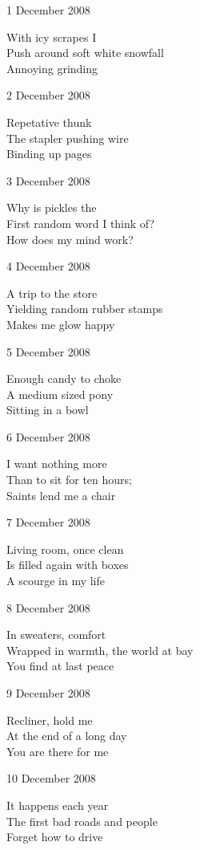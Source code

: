 \documentclass[12pt]{article}
\begin{document}
1 December 2008

With icy scrapes I \\
Push around soft white snowfall \\
Annoying grinding

2 December 2008

Repetative thunk \\
The stapler pushing wire \\
Binding up pages

3 December 2008

Why is pickles the \\
First random word I think of? \\
How does my mind work?

\newpage

4 December 2008

A trip to the store \\
Yielding random rubber stamps \\
Makes me glow happy

5 December 2008

Enough candy to choke \\
A medium sized pony \\
Sitting in a bowl

6 December 2008

I want nothing more \\
Than to sit for ten hours; \\
Saints lend me a chair

7 December 2008

Living room, once clean \\
Is filled again with boxes \\
A scourge in my life

8 December 2008

In sweaters, comfort \\
Wrapped in warmth, the world at bay \\
You find at last peace

9 December 2008

Recliner, hold me \\
At the end of a long day \\
You are there for me

10 December 2008

It happens each year \\
The first bad roads and people \\
Forget how to drive


\newpage
\end{document}
